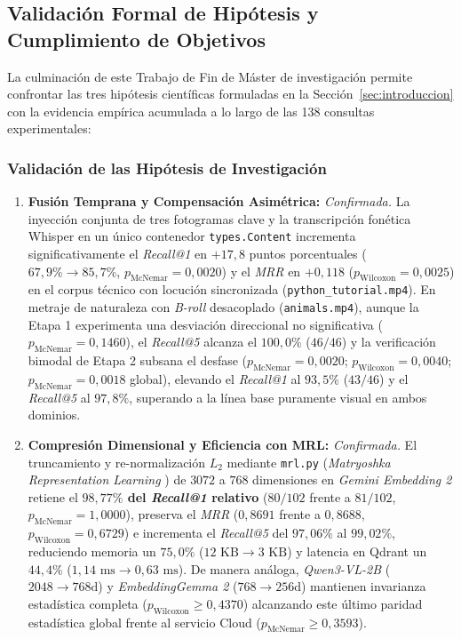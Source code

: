 \subsection{Validación Formal de Hipótesis y Cumplimiento de Objetivos}
\label{subsec:validacion_hipotesis_objetivos}

La culminación de este Trabajo de Fin de Máster de investigación permite confrontar las tres hipótesis científicas formuladas en la Sección~\ref{sec:introduccion} con la evidencia empírica acumulada a lo largo de las 138 consultas experimentales:

\subsubsection{Validación de las Hipótesis de Investigación}
\begin{enumerate}[label=\textbf{Hipótesis \arabic* ($H_\arabic*$):}, wide=0pt, leftmargin=*]
    \item \textbf{Fusión Temprana y Compensación Asimétrica:}
    \textit{Confirmada.} La inyección conjunta de tres fotogramas clave y la transcripción fonética Whisper en un único contenedor \texttt{types.Content} incrementa significativamente el \textit{Recall@1} en $+17,8$ puntos porcentuales ($67,9\% \to 85,7\%$, $p_{\text{McNemar}} = 0,0020$) y el \textit{MRR} en $+0,118$ ($p_{\text{Wilcoxon}} = 0,0025$) en el corpus técnico con locución sincronizada (\texttt{python\_tutorial.mp4}). En metraje de naturaleza con \textit{B-roll} desacoplado (\texttt{animals.mp4}), aunque la Etapa 1 experimenta una desviación direccional no significativa ($p_{\text{McNemar}} = 0,1460$), el \textit{Recall@5} alcanza el $100,0\%$ ($46/46$) y la verificación bimodal de Etapa 2 subsana el desfase ($p_{\text{McNemar}} = 0,0020$; $p_{\text{Wilcoxon}} = 0,0040$; $p_{\text{McNemar}} = 0,0018$ global), elevando el \textit{Recall@1} al \textbf{$93,5\%$} ($43/46$) y el \textit{Recall@5} al \textbf{$97,8\%$}, superando a la línea base puramente visual en ambos dominios.

    \item \textbf{Compresión Dimensional y Eficiencia con MRL:}
    \textit{Confirmada.} El truncamiento y re-normalización $L_2$ mediante \texttt{mrl.py} (\textit{Matryoshka Representation Learning} \cite{kusupati2022matryoshka}) de $3072$ a $768$ dimensiones en \textit{Gemini Embedding 2} retiene el \textbf{$98,77\%$ del \textit{Recall@1} relativo} ($80/102$ frente a $81/102$, $p_{\text{McNemar}} = 1,0000$), preserva el \textit{MRR} ($0,8691$ frente a $0,8688$, $p_{\text{Wilcoxon}} = 0,6729$) e incrementa el \textit{Recall@5} del $97,06\%$ al \textbf{$99,02\%$}, reduciendo memoria un \textbf{$75,0\%$} ($12\text{ KB} \to 3\text{ KB}$) y latencia en Qdrant un \textbf{$44,4\%$} ($1,14\text{ ms} \to 0,63\text{ ms}$). De manera análoga, \textit{Qwen3-VL-2B} ($2048 \to 768\text{d}$) y \textit{EmbeddingGemma 2} ($768 \to 256\text{d}$) mantienen invarianza estadística completa ($p_{\text{Wilcoxon}} \ge 0,4370$) alcanzando este último paridad estadística global frente al servicio Cloud ($p_{\text{McNemar}} \ge 0,3593$).


\end{enumerate}
